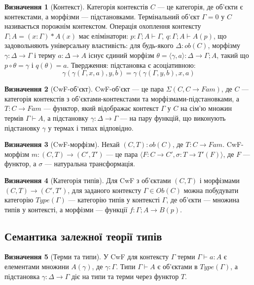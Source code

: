 \documentclass{article}
\theoremstyle{definition}
\newtheorem{definition}{Визначення}[section]
\begin{document}
\begin{definition}[Контекст]
Категорія контекстів $C$ --- це категорія, де об’єкти є контекстами, а морфізми --- підстановками. Термінальний об’єкт $\Gamma=0$ у $C$ називається порожнім контекстом. Операція охоплення контексту $\Gamma;A = (x:\Gamma)*A(x)$ має елімінатори: $p:\Gamma;A\vdash\Gamma$, $q:\Gamma;A\vdash A(p)$, що задовольняють універсальну властивість: для будь-якого $\Delta:ob(C)$, морфізму $\gamma:\Delta\rightarrow\Gamma$ і терму $a:\Delta\rightarrow A$ існує єдиний морфізм $\theta=\langle\gamma,a\rangle:\Delta\rightarrow\Gamma;A$, такий що $p\circ\theta=\gamma$ і $q(\theta)=a$. Твердження: підстановка є асоціативною:
\[
    \gamma(\gamma(\Gamma,x,a),y,b) = \gamma(\gamma(\Gamma,y,b),x,a)
\]
\end{definition}

\begin{definition}[CwF-об’єкт]
CwF-об’єкт --- це пара $\Sigma(C, C\rightarrow Fam)$, де $C$ --- категорія контекстів з об’єктами-контекстами та морфізмами-підстановками, а $T:C\rightarrow Fam$ --- функтор, який відображає контекст $\Gamma$ у $C$ на сім’ю множин термів $\Gamma\vdash A$, а підстановку $\gamma:\Delta\rightarrow\Gamma$ --- на пару функцій, що виконують підстановку $\gamma$ у термах і типах відповідно.
\end{definition}

\begin{definition}[CwF-морфізм]
Нехай $(C,T):ob(C)$, де $T:C\rightarrow Fam$. CwF-морфізм $m: (C,T)\rightarrow(C',T')$ --- це пара $\langle F:C\rightarrow C', \sigma:T\rightarrow T'(F) \rangle$, де $F$ --- функтор, а $\sigma$ --- натуральна трансформація.
\end{definition}

\begin{definition}[Категорія типів]
Для CwF з об’єктами $(C,T)$ і морфізмами $(C,T)\rightarrow(C',T')$, для заданого контексту $\Gamma \in Ob(C)$ можна побудувати категорію $Type(\Gamma)$ --- категорію типів у контексті $\Gamma$, де об’єкти --- множина типів у контексті, а морфізми --- функції $f:\Gamma;A\rightarrow B(p)$.
\end{definition}

\subsection{Семантика залежної теорії типів}

\begin{definition}[Терми та типи]
У CwF для контексту $\Gamma$ терми $\Gamma\vdash a:A$ є елементами множини $A(\gamma)$, де $\gamma:\Gamma$. Типи $\Gamma\vdash A$ є об’єктами в $Type(\Gamma)$, а підстановка $\gamma:\Delta\rightarrow\Gamma$ діє на типи та терми через функтор $T$.
\end{definition}
\end{document}
